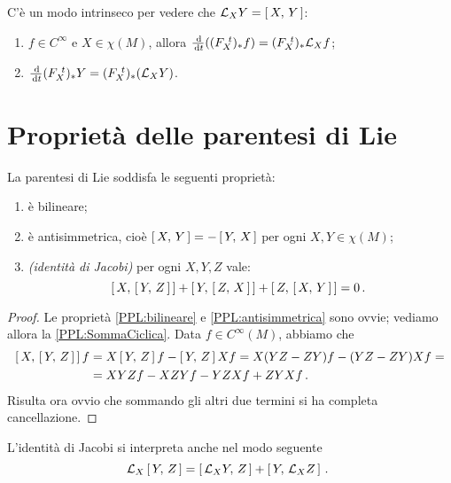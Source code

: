 \begin{remark}
	C'è un modo intrinseco per vedere che $\mathcal L_XY=\left[\,X,\,Y\,\right]$:
	\begin{enumerate} %
	 \item $f\in C^\infty$ e $X\in\chi(M)$, allora $\frac {\,\mathrm d}{\,\mathrm d t} ((F_{X}^{\ t})_*f)=(F_{X}^{\ t})_*\mathcal L_Xf$;
	 \item $\frac{\,\mathrm d}{\,\mathrm d t} (F_{X}^{\ t})_*Y=(F_{X}^{\ t})_*(\mathcal L_XY)$.
	\end{enumerate}
\end{remark}

\section{Proprietà delle parentesi di Lie}

\begin{proposition}\label{prop:ProprietaParentesiLie}
	La parentesi di Lie soddisfa le seguenti proprietà:
	\begin{enumerate}
	 \item è bilineare; \label{PPL:bilineare}
	 \item è antisimmetrica, cioè $\left[\,X,\,Y\,\right]=-\left[\,Y,\,X\,\right]$ per ogni $X,Y\in\chi(M)$; \label{PPL:antisimmetrica}
	 \item \emph{(identità di Jacobi)} per ogni $X,Y,Z$ vale: 
	 \begin{equation*}\left[\,X,\,\left[\,Y,\,Z\,\right]\,\right]+\left[\,Y,\,\left[\,Z,\,X\,\right]\,\right]+\left[\,Z,\,\left[\,X,\,Y\,\right]\,\right]=0\, \text{. }\end{equation*} \label{PPL:SommaCiclica}
	\end{enumerate}
\end{proposition}

\begin{proof}
	Le proprietà \ref{PPL:bilineare} e \ref{PPL:antisimmetrica} sono ovvie; vediamo allora la \ref{PPL:SommaCiclica}. Data $f\in C^\infty(M)$, abbiamo che
	\begin{align*}
		\left[\,X,\,\left[\,Y,\,Z\,\right]\,\right]f&=X\left[\,Y,\,Z\,\right]f-\left[\,Y,\,Z\,\right]Xf=X(YZ-ZY)f-(YZ-ZY)Xf=\\
		&= XYZf-XZYf-YZXf+ZYXf\, \text{. }
	\end{align*}
	Risulta ora ovvio che sommando gli altri due termini si ha completa cancellazione.
\end{proof}

\begin{remark}
	L'identità di Jacobi si interpreta anche nel modo seguente
	\begin{equation*}
		\mathcal L_X\left[\,Y,\,Z\,\right]=\left[\,\mathcal L_XY,\,Z\,\right]+\left[\,Y,\,\mathcal L_XZ\,\right]\, \text{. }
	\end{equation*}
\end{remark}


